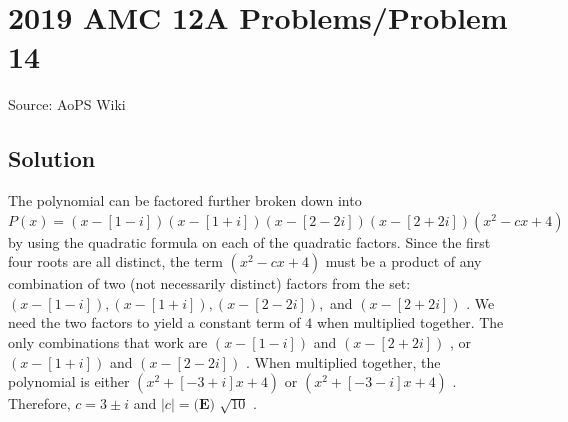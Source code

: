 \documentclass[12pt]{article}
\begin{document}
\section*{{2019 AMC 12A Problems/Problem 14}}
Source: AoPS Wiki

\subsection*{Solution}
The polynomial can be factored further broken down into $P(x) = (x - [1 - i])(x - [1 + i])(x - [2 - 2i])(x - [2 + 2i])(x^2 - cx + 4)$ by using the quadratic formula on each of the quadratic factors. Since the first four roots are all distinct, the term $(x^2 - cx + 4)$ must be a product of any combination of two (not necessarily distinct) factors from the set: $(x - [1 - i]), (x - [1 + i]), (x - [2 - 2i]),$ and $(x - [2 + 2i])$ . We need the two factors to yield a constant term of $4$ when multiplied together. The only combinations that work are $(x - [1 - i])$ and $(x - [2 + 2i])$ , or $(x - [1+i])$ and $(x - [2-2i])$ . When multiplied together, the polynomial is either $(x^2 + [-3 + i]x + 4)$ or $(x^2+[-3-i]x+4)$ . Therefore, $c = 3 \pm i$ and $|c| = \boxed{\textbf{(E) } \sqrt{10}}$ .
\end{document}
